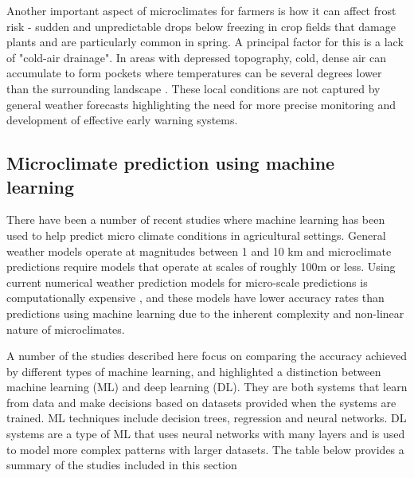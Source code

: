 Another important aspect of microclimates for farmers is how it can affect frost
risk - sudden and unpredictable drops below freezing in crop fields that damage
plants and are particularly common in spring. A principal factor for this is a
lack of "cold-air drainage". In areas with depressed topography, cold, dense air
can accumulate to form pockets where temperatures can be several
degrees lower than the surrounding landscape \cite{drepper2022}. These local
conditions are not captured by general weather forecasts highlighting the need for
more precise monitoring and development of effective early warning systems.

\subsection{Microclimate prediction using machine learning}

There have been a number of recent studies where machine learning has been used
to help predict micro climate conditions in agricultural settings. General
weather models operate at magnitudes between 1 and 10 km and microclimate
predictions require models that operate at scales of roughly 100m or less. Using
current numerical weather prediction models for micro-scale predictions is
computationally expensive \cite{blunn2024machine}, and these models have lower
accuracy rates than predictions using machine learning due to the inherent complexity and
non-linear nature of microclimates.

A number of the studies described here focus on comparing the accuracy achieved
by different types of machine learning, and highlighted a distinction between
machine learning (ML) and deep learning (DL).  They are both systems that learn
from data and make decisions based on datasets provided when the systems are
trained.  ML techniques include decision trees, regression and
neural networks.  DL systems are a type of ML that uses
neural networks with many layers and is used to model more complex patterns with
larger datasets. The table below provides a summary of the studies included in
this section


